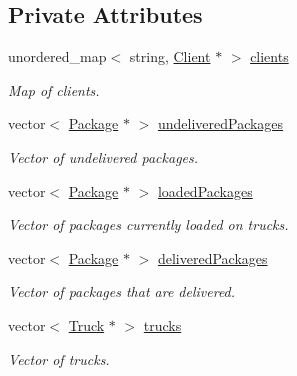 \subsection*{Private Attributes}
\begin{DoxyCompactItemize}
\item 
unordered\+\_\+map$<$ string, \hyperlink{classClient}{Client} $\ast$ $>$ \hyperlink{classWarehouse_a99bbbfe043d87282109a00c7d423cbd8}{clients}\hypertarget{classWarehouse_a99bbbfe043d87282109a00c7d423cbd8}{}\label{classWarehouse_a99bbbfe043d87282109a00c7d423cbd8}

\begin{DoxyCompactList}\small\item\em Map of clients. \end{DoxyCompactList}\item 
vector$<$ \hyperlink{classPackage}{Package} $\ast$ $>$ \hyperlink{classWarehouse_a815d9b27918b9e8548ef468e75e7c3c6}{undelivered\+Packages}\hypertarget{classWarehouse_a815d9b27918b9e8548ef468e75e7c3c6}{}\label{classWarehouse_a815d9b27918b9e8548ef468e75e7c3c6}

\begin{DoxyCompactList}\small\item\em Vector of undelivered packages. \end{DoxyCompactList}\item 
vector$<$ \hyperlink{classPackage}{Package} $\ast$ $>$ \hyperlink{classWarehouse_a3265c69eeb18c52668cee48b120122b6}{loaded\+Packages}\hypertarget{classWarehouse_a3265c69eeb18c52668cee48b120122b6}{}\label{classWarehouse_a3265c69eeb18c52668cee48b120122b6}

\begin{DoxyCompactList}\small\item\em Vector of packages currently loaded on trucks. \end{DoxyCompactList}\item 
vector$<$ \hyperlink{classPackage}{Package} $\ast$ $>$ \hyperlink{classWarehouse_aaffa66dffb83147778e22f39d2a2ea10}{delivered\+Packages}\hypertarget{classWarehouse_aaffa66dffb83147778e22f39d2a2ea10}{}\label{classWarehouse_aaffa66dffb83147778e22f39d2a2ea10}

\begin{DoxyCompactList}\small\item\em Vector of packages that are delivered. \end{DoxyCompactList}\item 
vector$<$ \hyperlink{classTruck}{Truck} $\ast$ $>$ \hyperlink{classWarehouse_ac32a0befb13262eff0ac228d0ec714a7}{trucks}\hypertarget{classWarehouse_ac32a0befb13262eff0ac228d0ec714a7}{}\label{classWarehouse_ac32a0befb13262eff0ac228d0ec714a7}

\begin{DoxyCompactList}\small\item\em Vector of trucks. \end{DoxyCompactList}\end{DoxyCompactItemize}


